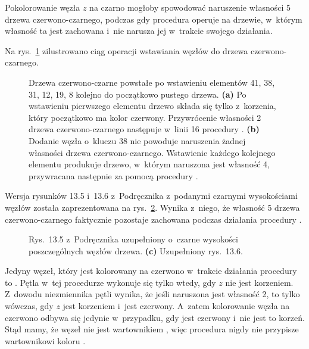 
\exercise %
Pokolorowanie węzła $z$ na czarno mogłoby spowodować naruszenie własności 5 drzewa czerwono-czarnego, podczas gdy procedura  operuje na drzewie, w~którym własność ta jest zachowana i~nie narusza jej w~trakcie swojego działania.

\exercise %
Na rys.\ \ref{fig:13.3-2} zilustrowano ciąg operacji wstawiania węzłów do drzewa czerwono-czarnego.
\begin{figure}[ht]
	\centering 
	\caption{Drzewa czerwono-czarne powstałe po wstawieniu elementów 41, 38, 31, 12, 19, 8 kolejno do początkowo pustego drzewa.
	{\sffamily\bfseries(a)} Po wstawieniu pierwszego elementu drzewo składa się tylko z~korzenia, który początkowo ma kolor czerwony.
	Przywrócenie własności 2 drzewa czerwono-czarnego następuje w~linii 16 procedury .
	{\sffamily\bfseries(b)} Dodanie węzła o~kluczu 38 nie powoduje naruszenia żadnej własności drzewa czerwono-czarnego.
	{\sffamily\bfseries{}} Wstawienie każdego kolejnego elementu produkuje drzewo, w~którym naruszona jest własność 4, przywracana następnie za pomocą procedury .} \label{fig:13.3-2}
\end{figure}

\exercise %
Wersja rysunków 13.5 i~13.6 z~Podręcznika z~podanymi czarnymi wysokościami węzłów została zaprezentowana na rys.\ \ref{fig:13.3-3}.
Wynika z~niego, że własność 5 drzewa czerwono-czarnego faktycznie pozostaje zachowana podczas działania procedury .
\begin{figure}[ht]
	\centering 
	\caption{{\sffamily\bfseries{}} Rys.\ 13.5 z~Podręcznika uzupełniony o~czarne wysokości poszczególnych węzłów drzewa.
	{\sffamily\bfseries(c)} Uzupełniony rys.\ 13.6.} \label{fig:13.3-3}
\end{figure}

\exercise %
Jedyny węzeł, który jest kolorowany na czerwono w~trakcie działania procedury  to .
Pętla  w~tej procedurze wykonuje się tylko wtedy, gdy $z$ nie jest korzeniem.
Z~dowodu niezmiennika pętli  wynika, że jeśli naruszona jest własność 2, to tylko wówczas, gdy $z$ jest korzeniem i~jest czerwony.
A~zatem kolorowanie węzła  na czerwono odbywa się jedynie w~przypadku, gdy  jest czerwony i~nie jest to korzeń.
Stąd mamy, że węzeł  nie jest wartownikiem , więc procedura  nigdy nie przypisze wartownikowi koloru .

\exercise %
\exercise %

